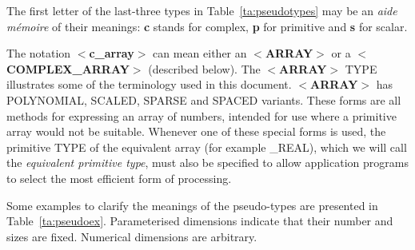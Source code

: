 \documentclass[twoside,11pt,nolof,noabs]{starlink}
\begin{document}
The first letter of the last-three types in Table~\ref{ta:pseudotypes}
may be an \textit{aide m\'{e}moire} of their meanings: \textbf{c} stands for
complex, \textbf{p} for primitive and \textbf{s} for scalar.

The notation $<$\textbf{c\_array}$>$ can mean either an $<$\textbf{ARRAY}$>$ or a
$<$\textbf{COMPLEX\_ARRAY}$>$ (described below). The \mbox{$<$\textbf{ARRAY}$>$} TYPE
illustrates some of the terminology used in this document.
\mbox{$<$\textbf{ARRAY}$>$} has
POLYNOMIAL, SCALED, SPARSE and SPACED variants.
These forms are all methods for expressing an array of numbers, intended
for use where a primitive array
would not be suitable.  Whenever one of
these special forms is used, the primitive TYPE of the
equivalent array (for example \_REAL), which we will call the
\textit{equivalent primitive type}, must also
be specified to allow application programs to select the
most efficient form of processing.

Some examples to clarify the meanings of the pseudo-types are presented
in Table~\ref{ta:pseudoex}.
Parameterised dimensions indicate that their number and sizes are
fixed. Numerical dimensions are arbitrary.
\end{document}
